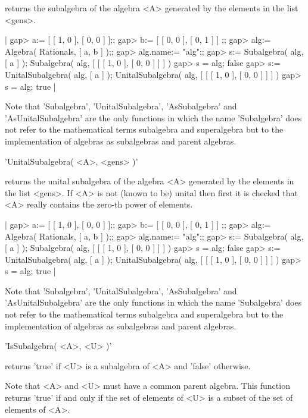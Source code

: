 returns the subalgebra of the algebra <A> generated by the elements in
the list <gens>.

|    gap> a:= [ [ 1, 0 ], [ 0, 0 ] ];;
    gap> b:= [ [ 0, 0 ], [ 0, 1 ] ] ;;
    gap> alg:= Algebra( Rationals, [ a, b ] );;
    gap> alg.name:= "alg";;
    gap> s:= Subalgebra( alg, [ a ] );
    Subalgebra( alg, [ [ [ 1, 0 ], [ 0, 0 ] ] ] )
    gap> s = alg;
    false
    gap> s:= UnitalSubalgebra( alg, [ a ] );
    UnitalSubalgebra( alg, [ [ [ 1, 0 ], [ 0, 0 ] ] ] )
    gap> s = alg;
    true |

Note that 'Subalgebra', 'UnitalSubalgebra', 'AsSubalgebra' and
'AsUnitalSubalgebra' are the only functions in which the name
'Subalgebra' does not refer to the mathematical terms subalgebra and 
superalgebra but to the implementation of algebras as subalgebras and
parent algebras.


'UnitalSubalgebra( <A>, <gens> )'

returns the unital subalgebra of the algebra <A> generated by the
elements in the list <gens>.
If <A> is not (known to be) unital then first it is checked that <A>
really contains the zero-th power of elements.

|    gap> a:= [ [ 1, 0 ], [ 0, 0 ] ];;
    gap> b:= [ [ 0, 0 ], [ 0, 1 ] ] ;;
    gap> alg:= Algebra( Rationals, [ a, b ] );;
    gap> alg.name:= "alg";;
    gap> s:= Subalgebra( alg, [ a ] );
    Subalgebra( alg, [ [ [ 1, 0 ], [ 0, 0 ] ] ] )
    gap> s = alg;
    false
    gap> s:= UnitalSubalgebra( alg, [ a ] );
    UnitalSubalgebra( alg, [ [ [ 1, 0 ], [ 0, 0 ] ] ] )
    gap> s = alg;
    true |

Note that 'Subalgebra', 'UnitalSubalgebra', 'AsSubalgebra' and
'AsUnitalSubalgebra' are the only functions in which the name
'Subalgebra' does not refer to the mathematical terms subalgebra and 
superalgebra but to the implementation of algebras as subalgebras and
parent algebras.


'IsSubalgebra( <A>, <U> )'

returns 'true' if <U> is a subalgebra of <A> and 'false' otherwise.

Note that <A> and <U> must have a common  parent algebra. This function
returns 'true' if and only if the set of elements of <U> is a subset of
the set of elements of <A>.

